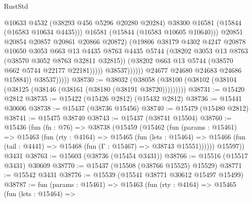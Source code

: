 \begin{lexlean}{RustStd}
\begin{coremodule}
                                        @10633
                                        @4532
                                        (@38293 @456 @5296 @20280 @20284)
                                        @38300
                                        @16581
                                        (@15844 (@16583 @10634 @4435)))
                                      @16581
                                      (@15844 (@16583 @10605 @10640)))
                                    @20851
                                    @20854
                                    @20857
                                    @20861
                                    @20866
                                    @20872)
                                  (@19806
                                    @38179
                                    @4302
                                    @4247
                                    @20878
                                    @10650
                                    @3053
                                    @663
                                    @13
                                    @4435
                                    @8763
                                    @4435
                                    @5744
                                    (@38202 @3053 @13 @8763 (@38570 @3052 @8763 @32811 @32815))
                                    (@38202 @663 @13 @5744 (@38570 @662 @5744 @22177 @22181)))))
                              @38537))))))
                  @24677
                  @24680
                  @24683
                  @24686
                  @15884))
              @38537)))))
@38730 := @38032
    (@38058 (@38100 (@38102 (@38104 (@38125 (@38146 (@38161 (@38180 (@38191 @38720)))))))))
@38731 := @15420 @2812
@38735 := @15422 (@15426 @2812) (@15432 @2812)
@38736 := @15441 @30606
@38738 := @15437 (@38736 @15456)
@38740 := @15479 (@15480 @2812)
@38741 := @15475 @38740
@38743 := @15437 (@38741 @15504)
@38760 := @15436
    (fun (fn : @76) =>
    @38738
      (@15459
        (@15462
          (fun (params : @15461) =>
          @15463
            (fun (rty : @4164) =>
            @15465
              (fun (lets : @15464) =>
              @15466 (fun (tail : @4441) => @15468 (fun (Γ : @15467) => @38743 @15551))))))
        @15597))
    @3431
@38763 := @15603 (@38736 (@15454 @3431))
@38766 := @15516 (@15517 @3431) @30609
@38770 := @15437 (@15508 (@38766 @15525) @15529)
@38771 := @15542 @3431
@38776 := @15539 (@15541 @38771 @30612 @15497 @15499)
@38787 := fun (params : @15461) =>
  @15463
    (fun (rty : @4164) =>
    @15465
      (fun (lets : @15464) =>

\end{coremodule}
\end{lexlean}
